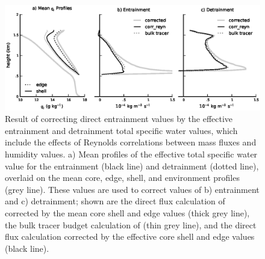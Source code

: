 \documentclass[draft,grl]{agutex}
\begin{document}
\begin{figure}
  \label{fig:Reynolds_correction}
  \noindent\includegraphics[width=39pc]{./figures/reynolds_correction}
  \caption{Result of correcting direct entrainment values by the effective 
  entrainment and detrainment total specific water values, which include the 
  effects of Reynolds correlations between mass fluxes and humidity values.
  a) Mean profiles of the effective total specific water value for 
  the entrainment (black line) and detrainment (dotted line), overlaid on the 
  mean core, edge, shell, and environment profiles (grey line).  These 
  values are used to correct values of b) entrainment and c) detrainment; shown 
  are the direct flux calculation of \cite{Romps2010} corrected by the mean 
  core shell and edge values (thick grey line), the bulk tracer budget 
  calculation of \cite{Siebesma1995} (thin grey line), and the direct flux 
  calculation corrected by the effective core shell and edge values (black 
  line).}
\end{figure}

%
%
%
%
%
%

\end{document}
